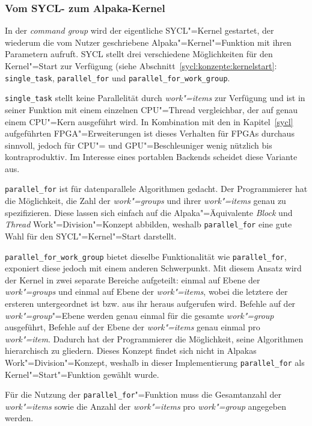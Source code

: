 \subsubsection{Vom SYCL- zum Alpaka-Kernel}
\label{implementierung:task:kernel:launch}

In der \textit{command group} wird der eigentliche SYCL"=Kernel gestartet, der
wiederum die vom Nutzer geschriebene Alpaka"=Kernel"=Funktion mit ihren
Parametern aufruft. SYCL stellt drei verschiedene Möglichkeiten für den
Kernel"=Start zur Verfügung (siehe Abschnitt~\ref{sycl:konzepte:kernelstart}:
\texttt{single\_task}, \texttt{parallel\_for} und
\texttt{parallel\_for\_work\_group}.

\texttt{single\_task} stellt keine Parallelität durch \textit{work"=items} zur
Verfügung und ist in seiner Funktion mit einem einzelnen CPU"=Thread
vergleichbar, der auf genau einem CPU"=Kern ausgeführt wird. In Kombination mit
den in Kapitel~\ref{sycl} aufgeführten FPGA"=Erweiterungen ist dieses Verhalten
für FPGAs durchaus sinnvoll, jedoch für CPU"= und GPU"=Beschleuniger wenig
nützlich bis kontraproduktiv. Im Interesse eines portablen Backends scheidet
diese Variante aus.

\texttt{parallel\_for} ist für datenparallele Algorithmen gedacht. Der
Programmierer hat die Möglichkeit, die Zahl der \textit{work"=groups} und ihrer
\textit{work"=items} genau zu spezifizieren. Diese lassen sich einfach auf die
Alpaka"=Äquivalente \textit{Block} und \textit{Thread} Work"=Division"=Konzept
abbilden, weshalb \texttt{parallel\_for} eine gute Wahl für den
SYCL"=Kernel"=Start darstellt.

\texttt{parallel\_for\_work\_group} bietet dieselbe Funktionalität wie
\texttt{parallel\_for}, exponiert diese jedoch mit einem anderen Schwerpunkt.
Mit diesem Ansatz wird der Kernel in zwei separate Bereiche aufgeteilt: einmal
auf Ebene der \textit{work"=groups} und einmal auf Ebene der
\textit{work"=items}, wobei die letztere der ersteren untergeordnet ist bzw.
aus ihr heraus aufgerufen wird. Befehle auf der \textit{work"=group}"=Ebene
werden genau einmal für die gesamte \textit{work"=group} ausgeführt, Befehle auf
der Ebene der \textit{work"=items} genau einmal pro \textit{work"=item}. Dadurch
hat der Programmierer die Möglichkeit, seine Algorithmen hierarchisch zu
gliedern. Dieses Konzept findet sich nicht in Alpakas Work"=Division"=Konzept,
weshalb in dieser Implementierung \texttt{parallel\_for} als
Kernel"=Start"=Funktion gewählt wurde.

Für die Nutzung der \texttt{parallel\_for}"=Funktion muss die Gesamtanzahl der
\textit{work"=items} sowie die Anzahl der \textit{work"=items} pro
\textit{work"=group} angegeben werden.

